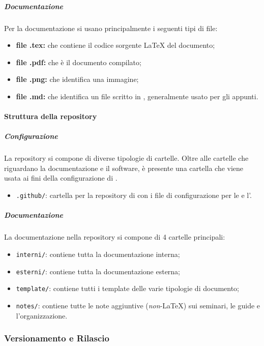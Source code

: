 		\subparagraph{Documentazione}

		Per la documentazione si usano principalmente i seguenti tipi di file:
		\begin{itemize}
			\item \textbf{file .tex:} che contiene il codice sorgente \LaTeX{} del documento;
			\item \textbf{file .pdf:} che è il documento compilato; 
			\item \textbf{file .png:} che identifica una immagine;
			\item \textbf{file .md:} che identifica un file scritto in , generalmente usato per gli appunti.
		\end{itemize}

	\paragraph{Struttura della repository}

		\subparagraph{Configurazione}

		La repository si compone di diverse tipologie di cartelle. Oltre alle cartelle che riguardano la documentazione e il software, è presente una cartella che viene usata ai fini della configurazione di .
		\begin{itemize}
			\item \verb!.github/!: cartella per la repository di  con i file di configurazione per le  e l'.
		\end{itemize}

		\subparagraph{Documentazione}

		La documentazione nella repository si compone di 4 cartelle principali:
		\begin{itemize}
			\item \verb!interni/!: contiene tutta la documentazione interna;
			\item \verb!esterni/!: contiene tutta la documentazione esterna;
			\item \verb!template/!: contiene tutti i template delle varie tipologie di documento;
			\item \verb!notes/!: contiene tutte le note aggiuntive (\textit{non}-\LaTeX{}) sui seminari, le guide e l'organizzazione.
		\end{itemize}

	


\subsubsection{Versionamento e Rilascio}

